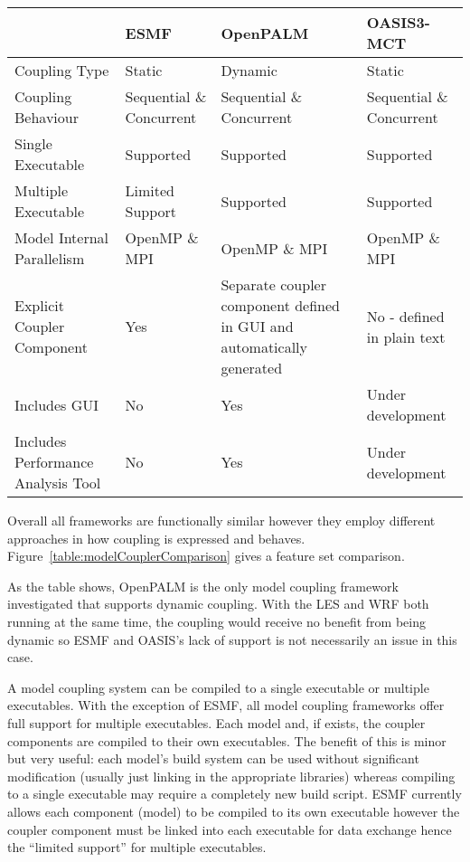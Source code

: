 \begin{figure*}
    \begin{tabular}{|l|l|p{4cm}|l|}
        \hline
        & ESMF & OpenPALM & OASIS3-MCT\\
        \hline
        Coupling Type & Static & Dynamic & Static\\
        \hline
        Coupling Behaviour & Sequential \& Concurrent & Sequential \&
        Concurrent & Sequential \& Concurrent\\
        \hline
        Single Executable & Supported & Supported & Supported\\
        \hline
        Multiple Executable & Limited Support & Supported & Supported\\
        \hline
        Model Internal Parallelism & OpenMP \& MPI & OpenMP \& MPI & OpenMP
        \& MPI\\
        \hline
        Explicit Coupler Component & Yes & Separate coupler component defined
        in GUI and automatically generated & No - defined in plain text\\
        \hline
        Includes GUI & No & Yes & Under development\\
        \hline
        Includes Performance Analysis Tool & No & Yes & Under development\\
        \hline
    \end{tabular}
    \caption{Comparison of model coupling framework support}
    \label{table:modelCouplerComparison}
\end{figure*}

Overall all frameworks are functionally similar however they employ different
approaches in how coupling is expressed and behaves.
Figure~\ref{table:modelCouplerComparison} gives a feature set comparison.

As the table shows, OpenPALM is the only model coupling framework investigated
that supports dynamic coupling. With the LES and WRF both running at the same
time, the coupling would receive no benefit from being dynamic so ESMF and
OASIS's lack of support is not necessarily an issue in this case.

A model coupling system can be compiled to a single executable or multiple
executables. With the exception of ESMF, all model coupling frameworks offer
full support for multiple executables. Each model and, if exists, the coupler
components are compiled to their own executables. The benefit of this is minor
but very useful: each model's build system can be used without significant
modification (usually just linking in the appropriate libraries) whereas
compiling to a single executable may require a completely new build script. ESMF
currently allows each component (model) to be compiled to its own executable
however the coupler component must be linked into each executable for data
exchange hence the ``limited support'' for multiple executables.

